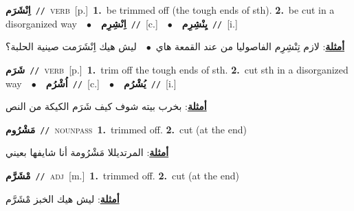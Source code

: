\documentclass[10pt,a4paper,twoside]{article} %
\begin{document}
\begin{multicols}{2}
{\setlength\topsep{0pt}\textbf{\foreignlanguage{arabic}{اِنْشَرَم}}\ {\color{gray}\texttt{//}\color{black}}\ \textsc{verb}\ [p.]\ \textbf{1.}~be trimmed off (the tough ends of sth).  \textbf{2.}~be cut in a disorganized way\ \ $\bullet$\ \ \setlength\topsep{0pt}\textbf{\foreignlanguage{arabic}{اِنْشِرِم}}\ {\color{gray}\texttt{//}\color{black}}\ [c.]\ \ $\bullet$\ \ \setlength\topsep{0pt}\textbf{\foreignlanguage{arabic}{يِنْشِرِم}}\ {\color{gray}\texttt{//}\color{black}}\ [i.]\  \begin{flushright}\color{gray}\foreignlanguage{arabic}{\textbf{\underline{\foreignlanguage{arabic}{أمثلة}}}: لازم تِنْشِرِم الفاصوليا من عند القمعة هاي\ $\bullet$\ \  ليش هيك اِنْشَرَمت صينية الحلبة؟}\end{flushright}\color{black}} \vspace{2mm}

{\setlength\topsep{0pt}\textbf{\foreignlanguage{arabic}{شَرَم}}\ {\color{gray}\texttt{//}\color{black}}\ \textsc{verb}\ [p.]\ \textbf{1.}~trim off the tough ends of sth.  \textbf{2.}~cut sth in a disorganized way\ \ $\bullet$\ \ \setlength\topsep{0pt}\textbf{\foreignlanguage{arabic}{اُشْرُم}}\ {\color{gray}\texttt{//}\color{black}}\ [c.]\ \ $\bullet$\ \ \setlength\topsep{0pt}\textbf{\foreignlanguage{arabic}{يُشْرُم}}\ {\color{gray}\texttt{//}\color{black}}\ [i.]\  \begin{flushright}\color{gray}\foreignlanguage{arabic}{\textbf{\underline{\foreignlanguage{arabic}{أمثلة}}}: بخرب بيته شوف كيف شَرَم الكيكة من النص}\end{flushright}\color{black}} \vspace{2mm}

{\setlength\topsep{0pt}\textbf{\foreignlanguage{arabic}{مَشْرُوم}}\ {\color{gray}\texttt{//}\color{black}}\ \textsc{noun\textunderscore pass}\ \textbf{1.}~trimmed off.  \textbf{2.}~cut  (at the end)\  \begin{flushright}\color{gray}\foreignlanguage{arabic}{\textbf{\underline{\foreignlanguage{arabic}{أمثلة}}}: المرتديللا مَشْرُومة أنا شايفها بعيني}\end{flushright}\color{black}} \vspace{2mm}

{\setlength\topsep{0pt}\textbf{\foreignlanguage{arabic}{مْشَرَّم}}\ {\color{gray}\texttt{//}\color{black}}\ \textsc{adj}\ [m.]\ \textbf{1.}~trimmed off.  \textbf{2.}~cut  (at the end)\  \begin{flushright}\color{gray}\foreignlanguage{arabic}{\textbf{\underline{\foreignlanguage{arabic}{أمثلة}}}: ليش هيك الخبز مْشَرَّم}\end{flushright}\color{black}} \vspace{2mm}


\end{multicols}
\end{document}
